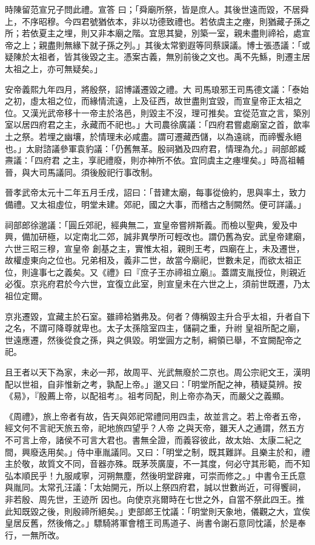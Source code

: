 \begin{pinyinscope}
 時陳留范宣兄子問此禮。宣答
 曰；「舜廟所祭，皆是庶人。其後世遠而毀，不居舜上，不序昭穆。今四君號猶依本，非以功德致禮也。若依虞主之瘞，則猶藏子孫之所；若依夏主之埋，則又非本廟之階。宜思其變，別築一室，親未盡則禘袷，處宣帝之上；親盡則無緣下就子孫之列。」其後太常劉遐等同蔡謨議。博士張憑議：「或疑陳於太祖者，皆其後毀之主。憑案古義，無別前後之文也。禹不先鯀，則遷主居太祖之上，亦可無疑矣。」



 安帝義熙九年四月，將殷祭，詔博議遷毀之禮。大
 司馬琅邪王司馬德文議：「泰始之初，虛太祖之位，而緣情流遠，上及征西，故世盡則宜毀，而宣皇帝正太祖之位。又漢光武帝移十一帝主於洛邑，則毀主不沒，理可推矣。宜從范宣之言，築別室以居四府君之主，永藏而不祀也。」大司農徐廣議：「四府君嘗處廟室之首，歆率土之祭。若埋之幽壤，於情理未必咸盡。謂可遷藏西儲，以為遠祧，而禘饗永絕也。」太尉諮議參軍袁豹議：「仍舊無革。殷祠猶及四府君，情理為允。」祠部郎臧燾議：「四府君
 之主，享祀禮廢，則亦神所不依。宜同虞主之瘞埋矣。」時高祖輔晉，與大司馬議同。須後殷祀行事改制。



 晉孝武帝太元十二年五月壬戌，詔曰：「昔建太廟，每事從儉約，思與率土，致力備禮。又太祖虛位，明堂未建。郊祀，國之大事，而稽古之制闕然。便可詳議。」



 祠部郎徐邈議：「圓丘郊祀，經典無二，宣皇帝嘗辨斯義。而檢以聖典，爰及中興，備加研極，以定南北二郊，誠非異學所可輕改也。謂仍舊為安。武皇帝建廟，六世三昭三穆，宣皇帝
 創基之主，實惟太祖，親則王考，四廟在上，未及遷世，故權虛東向之位也。兄弟相及，義非二世，故當今廟祀，世數未足，而欲太祖正位，則違事七之義矣。又《禮》曰『庶子王亦禘祖立廟』。蓋謂支胤授位，則親近必復。京兆府君於今六世，宜復立此室，則宣皇未在六世之上，須前世既遷，乃太祖位定爾。



 京兆遷毀，宜藏主於石室。雖禘袷猶弗及。何者？傳稱毀主升合乎太祖，升者自下之名，不謂可降尊就卑也。太子太孫陰室四主，儲嗣之重，升祔
 皇祖所配之廟，世遠應遷，然後從食之孫，與之俱毀。明堂圓方之制，綱領已舉，不宜闕配帝之祀。



 且王者以天下為家，未必一邦，故周平、光武無廢於二京也。周公宗祀文王，漢明配以世祖，自非惟新之考，孰配上帝。」邈又曰：「明堂所配之神，積疑莫辨。按《易》，『殷薦上帝，以配祖考』。祖考同配，則上帝亦為天，而嚴父之義顯。



 《周禮》，旅上帝者有故，告天與郊祀常禮同用四圭，故並言之。若上帝者五帝，經文何不言祀天旅五帝，祀地旅四望乎？人帝
 之與天帝，雖天人之通謂，然五方不可言上帝，諸侯不可言大君也。書無全證，而義容彼此，故太始、太康二紀之間，興廢迭用矣。」侍中車胤議同。又曰：「明堂之制，既其難詳。且樂主於和，禮主於敬，故質文不同，音器亦殊。既茅茨廣廈，不一其度，何必守其形範，而不知弘本順民乎！九服咸寧，河朔無塵，然後明堂辟雍，可崇而修之。」中書令王氏意與胤同。太常孔汪議：「太始開元，所以上祭四府君，誠以世數尚近，可得饗祠，非若殷、周先世，王迹所
 因也。向使京兆爾時在七世之外，自當不祭此四王。推此知既毀之後，則殷禘所絕矣。」吏部郎王忱議：「明堂則天象地，儀觀之大，宜俟皇居反舊，然後脩之。」驃騎將軍會稽王司馬道子、尚書令謝石意同忱議，於是奉行，一無所改。




\end{pinyinscope}
